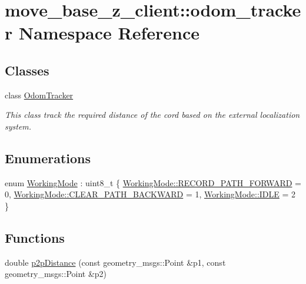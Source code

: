 \hypertarget{namespacemove__base__z__client_1_1odom__tracker}{}\section{move\+\_\+base\+\_\+z\+\_\+client\+:\+:odom\+\_\+tracker Namespace Reference}
\label{namespacemove__base__z__client_1_1odom__tracker}
\subsection*{Classes}
\begin{DoxyCompactItemize}
\item 
class \hyperlink{classmove__base__z__client_1_1odom__tracker_1_1OdomTracker}{Odom\+Tracker}
\begin{DoxyCompactList}\small\item\em This class track the required distance of the cord based on the external localization system. \end{DoxyCompactList}\end{DoxyCompactItemize}
\subsection*{Enumerations}
\begin{DoxyCompactItemize}
\item 
enum \hyperlink{namespacemove__base__z__client_1_1odom__tracker_adf3e5fc3644563922cc64a20a0197224}{Working\+Mode} \+: uint8\+\_\+t \{ \hyperlink{namespacemove__base__z__client_1_1odom__tracker_adf3e5fc3644563922cc64a20a0197224a989d06a586bcf9520889228da7faa643}{Working\+Mode\+::\+R\+E\+C\+O\+R\+D\+\_\+\+P\+A\+T\+H\+\_\+\+F\+O\+R\+W\+A\+RD} = 0, 
\hyperlink{namespacemove__base__z__client_1_1odom__tracker_adf3e5fc3644563922cc64a20a0197224a0cf8f27617189e35619df3c18bda6274}{Working\+Mode\+::\+C\+L\+E\+A\+R\+\_\+\+P\+A\+T\+H\+\_\+\+B\+A\+C\+K\+W\+A\+RD} = 1, 
\hyperlink{namespacemove__base__z__client_1_1odom__tracker_adf3e5fc3644563922cc64a20a0197224aa5daf7f2ebbba4975d61dab1c40188c7}{Working\+Mode\+::\+I\+D\+LE} = 2
 \}
\end{DoxyCompactItemize}
\subsection*{Functions}
\begin{DoxyCompactItemize}
\item 
double \hyperlink{namespacemove__base__z__client_1_1odom__tracker_a4437fd4b6bf9ca87f5b806ad408fb430}{p2p\+Distance} (const geometry\+\_\+msgs\+::\+Point \&p1, const geometry\+\_\+msgs\+::\+Point \&p2)
\end{DoxyCompactItemize}


